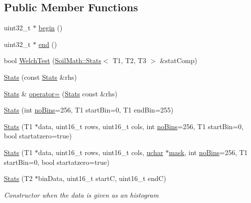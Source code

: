 \subsection*{Public Member Functions}
\begin{DoxyCompactItemize}
\item 
uint32\+\_\+t $\ast$ \hyperlink{class_soil_math_1_1_stats_ab4b0109ffb55f1d39acfad46bfd3bad5}{begin} ()
\item 
uint32\+\_\+t $\ast$ \hyperlink{class_soil_math_1_1_stats_a9d60ce82a2786e0422c3683c301f34ae}{end} ()
\item 
bool \hyperlink{class_soil_math_1_1_stats_a45f110fe8f440a4e45ef2b4e6cd9863c}{Welch\+Test} (\hyperlink{class_soil_math_1_1_stats}{Soil\+Math\+::\+Stats}$<$ T1, T2, T3 $>$ \&stat\+Comp)
\item 
\hyperlink{class_soil_math_1_1_stats_aa9727b7ea39b46f8a010a7b710b26d83}{Stats} (const \hyperlink{class_soil_math_1_1_stats}{Stats} \&rhs)
\item 
\hyperlink{class_soil_math_1_1_stats}{Stats} \& \hyperlink{class_soil_math_1_1_stats_ad3444d680b185196786b135f0a254a19}{operator=} (\hyperlink{class_soil_math_1_1_stats}{Stats} const \&rhs)
\item 
\hyperlink{class_soil_math_1_1_stats_a2bc3899fe78a6c5fedad5f22b90d9963}{Stats} (int \hyperlink{class_soil_math_1_1_stats_a4202c9085eacaff2e04eda84fc90e92b}{no\+Bins}=256, T1 start\+Bin=0, T1 end\+Bin=255)
\item 
\hyperlink{class_soil_math_1_1_stats_afee0afbb0228d8bb524dbe2b68c1e980}{Stats} (T1 $\ast$data, uint16\+\_\+t rows, uint16\+\_\+t cols, int \hyperlink{class_soil_math_1_1_stats_a4202c9085eacaff2e04eda84fc90e92b}{no\+Bins}=256, T1 start\+Bin=0, bool startatzero=true)
\item 
\hyperlink{class_soil_math_1_1_stats_a8d97e603126f134907f1e4b3b07f7808}{Stats} (T1 $\ast$data, uint16\+\_\+t rows, uint16\+\_\+t cols, \hyperlink{_soil_math_types_8h_a65f85814a8290f9797005d3b28e7e5fc}{uchar} $\ast$\hyperlink{_gen_blob_8m_a2f6787d513f2bdbca6833c1c1ee04329}{mask}, int \hyperlink{class_soil_math_1_1_stats_a4202c9085eacaff2e04eda84fc90e92b}{no\+Bins}=256, T1 start\+Bin=0, bool startatzero=true)
\item 
\hyperlink{class_soil_math_1_1_stats_aba14006e6fdc6369a9e723390ed5d75c}{Stats} (T2 $\ast$bin\+Data, uint16\+\_\+t start\+C, uint16\+\_\+t end\+C)
\begin{DoxyCompactList}\small\item\em Constructor when the data is given as an histogram \end{DoxyCompactList}\item 

\end{DoxyCompactItemize}
